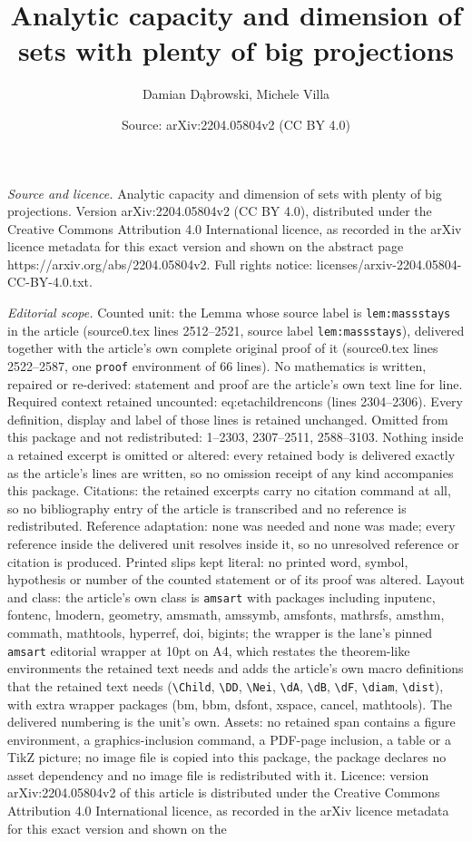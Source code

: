 \documentclass[10pt,a4paper]{amsart}
\title[Analytic capacity and dimension of sets with plenty of big p]{Analytic capacity and dimension of sets with plenty of big projections}
\author{Damian D\k{a}browski, Michele Villa}
\date{Source: arXiv:2204.05804v2 (CC BY 4.0)}
\begin{document}
\maketitle

\noindent\emph{Source and licence.} Analytic capacity and dimension of sets with plenty of big projections. Version arXiv:2204.05804v2 (CC BY 4.0), distributed under the Creative Commons Attribution 4.0 International licence, as recorded in the arXiv licence metadata for this exact version and shown on the abstract page https://arxiv.org/abs/2204.05804v2. Full rights notice: licenses/arxiv-2204.05804-CC-BY-4.0.txt.\par\smallskip

\noindent\textit{Editorial scope.} Counted unit: the Lemma whose source label is \texttt{lem:massstays} in the article (source0.tex lines 2512--2521, source label \texttt{lem:massstays}), delivered together with the article's own complete original proof of it (source0.tex lines 2522--2587, one \texttt{proof} environment of 66 lines). No mathematics is written, repaired or re-derived: statement and proof are the article's own text line for line. Required context retained uncounted: eq:etachildrencons (lines 2304--2306). Every definition, display and label of those lines is retained unchanged. Omitted from this package and not redistributed: 1--2303, 2307--2511, 2588--3103. Nothing inside a retained excerpt is omitted or altered: every retained body is delivered exactly as the article's lines are written, so no omission receipt of any kind accompanies this package. Citations: the retained excerpts carry no citation command at all, so no bibliography entry of the article is transcribed and no reference is redistributed. Reference adaptation: none was needed and none was made; every reference inside the delivered unit resolves inside it, so no unresolved reference or citation is produced. Printed slips kept literal: no printed word, symbol, hypothesis or number of the counted statement or of its proof was altered. Layout and class: the article's own class is \texttt{amsart} with packages including inputenc, fontenc, lmodern, geometry, amsmath, amssymb, amsfonts, mathrsfs, amsthm, commath, mathtools, hyperref, doi, bigints; the wrapper is the lane's pinned \texttt{amsart} editorial wrapper at 10pt on A4, which restates the theorem-like environments the retained text needs and adds the article's own macro definitions that the retained text needs (\texttt{\textbackslash Child}, \texttt{\textbackslash DD}, \texttt{\textbackslash Nei}, \texttt{\textbackslash dA}, \texttt{\textbackslash dB}, \texttt{\textbackslash dF}, \texttt{\textbackslash diam}, \texttt{\textbackslash dist}), with extra wrapper packages (bm, bbm, dsfont, xspace, cancel, mathtools). The delivered numbering is the unit's own. Assets: no retained span contains a figure environment, a graphics-inclusion command, a PDF-page inclusion, a table or a TikZ picture; no image file is copied into this package, the package declares no asset dependency and no image file is redistributed with it. Licence: version arXiv:2204.05804v2 of this article is distributed under the Creative Commons Attribution 4.0 International licence, as recorded in the arXiv licence metadata for this exact version and shown on the 
\end{document}
